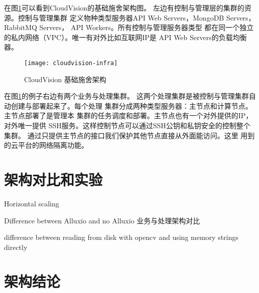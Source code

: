 在图\ref{fig:cloudvision-infra}可以看到CloudVision的基础施舍架构图。
左边有控制与管理层的集群的资源。控制与管理集群
定义物种类型服务器API Web Servers，MongoDB Servers，
RabbitMQ Servers， API Workers。所有控制与管理服务器类型
都在同一个独立的私内网络（VPC）。唯一有对外比如互联网IP是
API Web Servers的负载均衡器。
\begin{figure}[h]
  \centering
    \texttt{[image: cloudvision-infra]}
  \caption{CloudVision 基础施舍架构}
  \label{fig:cloudvision-infra}
\end{figure}

在图\ref{fig:cloudvision-infra}的例子右边有两个业务与处理集群。
这两个处理集群是被控制与管理集群自动创建与部署起来了。每个处理
集群分成两种类型服务器：主节点和计算节点。主节点部署了是管理本
集群的任务调度和部署。主节点也有一个对外提供的IP，对外唯一提供
SSH服务。这样控制节点可以通过SSH公钥和私钥安全的控制整个集群。
通过只提供主节点的接口我们保护其他节点直接从外面能访问。这里
用到的云平台的网络隔离功能。



\section{架构对比和实验}
\label{sec:arch_experiment}

Horizontal scaling

Difference between Alluxio and no Alluxio
业务与处理架构对比

difference between reading from disk with opencv and using memory strings directly


\section{架构结论}
